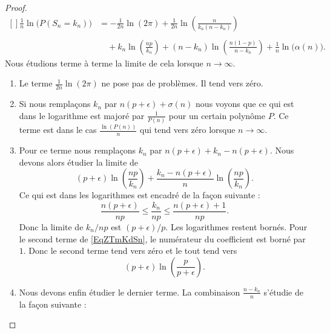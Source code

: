 \begin{proof}
    \begin{equation}
        \begin{aligned}[]
        \frac{1}{ n }\ln\big( P(S_n=k_n) \big)&=-\frac{1}{ 2n }\ln(2\pi)+\frac{1}{ 2n }\ln\left( \frac{ n }{ k_n(n-k_n) } \right)\\
        \\&\quad+k_n\ln\left( \frac{ np }{ k_n } \right)+(n-k_n)\ln\left( \frac{ n(1-p) }{ n-k_n } \right)+\frac{1}{ n }\ln\big( \alpha(n) \big).
        \end{aligned}
    \end{equation}
    Nous étudions terme à terme la limite de cela lorsque \( n\to \infty\).
    \begin{enumerate}
        \item
            Le terme \( \frac{1}{ 2n }\ln(2\pi)\) ne pose pas de problèmes. Il tend vers zéro.
        \item
            Si nous remplaçons \( k_n\) par \( n(p+\epsilon)+\sigma(n)\) nous voyons que ce qui est dans le logarithme est majoré par \( \frac{1}{ P(n) }\) pour un certain polynôme \( P\). Ce terme est dans le cas \( \frac{ \ln(P(n)) }{ n }\) qui tend vers zéro lorsque \( n\to \infty\).
        \item
            Pour ce terme nous remplaçons \( k_n\) par \( n(p+\epsilon)+k_n-n(p+\epsilon)\). Nous devons alors étudier la limite de
            \begin{equation}    \label{EqZTmKdSn}
                (p+\epsilon)\ln\left( \frac{ np }{ k_n } \right)+\frac{ k_n-n(p+\epsilon) }{ n }\ln\left( \frac{ np }{ k_n } \right).
            \end{equation}
            Ce qui est dans les logarithmes est encadré de la façon suivante :
            \begin{equation}
                \frac{ n(p+\epsilon) }{ np }\leq\frac{ k_n }{ np }\leq \frac{ n(p+\epsilon)+1 }{ np }.
            \end{equation}
            Donc la limite de \( k_n/np\) est \( (p+\epsilon)/p\). Les logarithmes restent bornés. Pour le second terme de \eqref{EqZTmKdSn}, le numérateur du coefficient est borné par \( 1\). Donc le second terme tend vers zéro et le tout tend vers
            \begin{equation}
                (p+\epsilon)\ln\left( \frac{ p }{ p+\epsilon } \right).
            \end{equation}
        \item
            Nous devons enfin étudier le dernier terme. La combinaison \( \frac{ n-k_n }{ n }\) s'étudie de la façon suivante :

\end{enumerate}
\end{proof}
